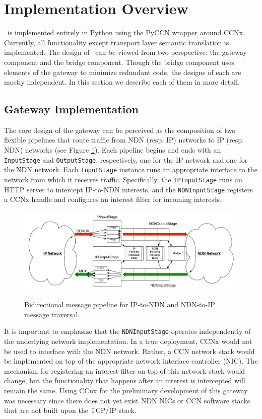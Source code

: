 \section{Implementation Overview}
\sink\ is implemented entirely in Python using the PyCCN \cite{pyccn} wrapper around CCNx. Currently, all functionality except transport layer semantic translation is implemented. The design of \sink\ can be viewed from two perspective: the gateway component and the bridge component. Though the bridge component uses elements of the gateway to minimize redundant code, the designs of each are mostly independent. In this section we describe each of them in more detail. 

\subsection{Gateway Implementation}
The core design of the gateway can be perceived as the composition of two flexible pipelines that route traffic from NDN (resp. IP) networks to IP (resp. NDN) networks (see Figure \ref{fig:pipeline}). Each pipeline begins and ends with an {\tt InputStage} and {\tt OutputStage}, respectively, one for the IP network and one for the NDN network. Each {\tt InputStage} instance runs an appropriate interface to the network from which it receives traffic. Specifically, the {\tt IPInputStage} runs an HTTP server to intercept IP-to-NDN interests, and the {\tt NDNInputStage} registers a CCNx handle and configures an interest filter for incoming interests. 

\begin{figure}[ht!]
\begin{center}
\includegraphics[scale=0.45]{./images/pipeline.pdf}
\label{fig:pipeline}
\caption{Bidirectional message pipeline for IP-to-NDN and NDN-to-IP message traversal.}
\end{center}
\end{figure}

It is important to emphasize that the {\tt NDNInputStage} operates independently of the underlying network implementation. In a true deployment, CCNx would not be used to interface with the NDN network. Rather, a CCN network stack would be implemented on top of the appropriate network interface controller (NIC). The mechanism for registering an interest filter on top of this network stack would change, but the functionality that happens after an interest is intercepted will remain the same. Using CCnx for the preliminary development of this gateway was necessary since there does not yet exist NDN NICs or CCN software stacks that are not built upon the TCP/IP stack.

